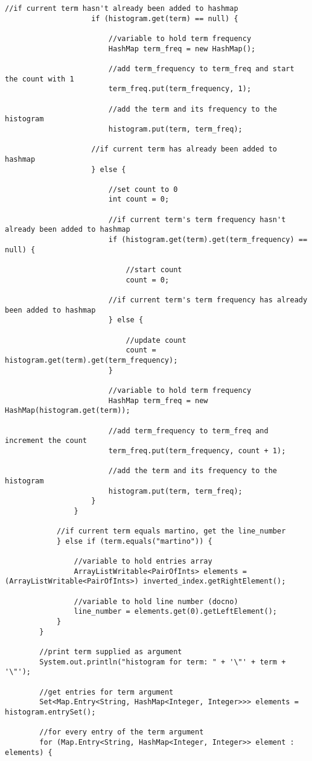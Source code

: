 \documentclass{article} %
\begin{document}
\begin{lstlisting}[style=Java]
					//if current term hasn't already been added to hashmap
					if (histogram.get(term) == null) {
						
						//variable to hold term frequency
						HashMap term_freq = new HashMap();
						
						//add term_frequency to term_freq and start the count with 1
						term_freq.put(term_frequency, 1);
						
						//add the term and its frequency to the histogram
						histogram.put(term, term_freq);
					
					//if current term has already been added to hashmap
					} else {
						
						//set count to 0
						int count = 0;
						
						//if current term's term frequency hasn't already been added to hashmap
						if (histogram.get(term).get(term_frequency) == null) {
						
							//start count
							count = 0;
						
						//if current term's term frequency has already been added to hashmap
						} else {
							
							//update count
							count = histogram.get(term).get(term_frequency);
						}
						
						//variable to hold term frequency
						HashMap term_freq = new HashMap(histogram.get(term));
						
						//add term_frequency to term_freq and increment the count
						term_freq.put(term_frequency, count + 1);
						
						//add the term and its frequency to the histogram
						histogram.put(term, term_freq);
					}
				}
				
			//if current term equals martino, get the line_number
			} else if (term.equals("martino")) {
				
				//variable to hold entries array
				ArrayListWritable<PairOfInts> elements = (ArrayListWritable<PairOfInts>) inverted_index.getRightElement();
				
				//variable to hold line number (docno)
				line_number = elements.get(0).getLeftElement();
			}
		}
		
		//print term supplied as argument
		System.out.println("histogram for term: " + '\"' + term + '\"');
		
		//get entries for term argument
		Set<Map.Entry<String, HashMap<Integer, Integer>>> elements = histogram.entrySet();
		
		//for every entry of the term argument
		for (Map.Entry<String, HashMap<Integer, Integer>> element : elements) {
			

\end{lstlisting}
\end{document}
